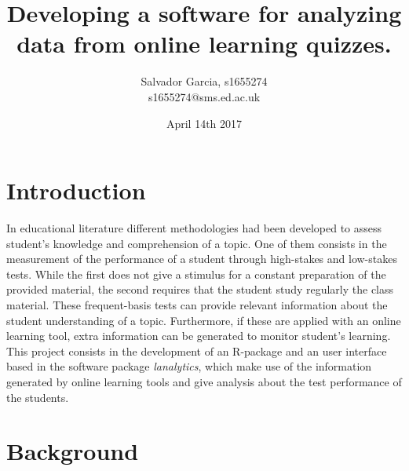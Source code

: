 \documentclass{article}
\author{Salvador Garcia, s1655274 \\
s1655274@sms.ed.ac.uk}
\date{April 14th 2017}
\title{Developing a software for analyzing data from online learning quizzes.}
\begin{document}
\maketitle

\section*{Introduction}
In educational literature different methodologies had been developed to assess student's knowledge and comprehension of a topic. One of them consists in the measurement of the performance of a student through high-stakes and low-stakes tests. While the first does not give a stimulus for a constant preparation of the provided material, the second requires that the student study regularly the class material. These frequent-basis tests can provide relevant information about the student understanding of a topic. Furthermore, if these are applied with an online learning tool, extra information can be generated to monitor student's learning. This project consists in the development of an \textsf{R}-package and an user interface based in the software package \textit{lanalytics}, which make use of the information generated by online learning tools and give analysis about the test performance of the students.

  
  \section*{Background} 
\end{document}
